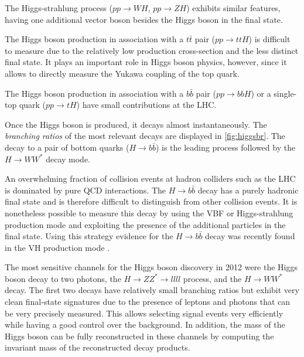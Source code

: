 
The Higgs-strahlung process ($pp \rightarrow WH$, $pp \rightarrow ZH$) exhibits similar features, having one additional vector boson besides the Higgs boson in the final state.

The Higgs boson production in association with a $t\bar{t}$ pair ($pp \rightarrow ttH$) is difficult to measure due to the relatively low production cross-section and the less distinct final state. It plays an important role in Higgs boson physics, however, since it allows to directly measure the Yukawa coupling of the top quark. 

The Higgs boson production in association with a $b\bar{b}$ pair ($pp\rightarrow bbH$) or a single-top quark ($pp \rightarrow tH$) have small contributions at the LHC.


Once the Higgs boson is produced, it decays almost instantaneously. The \emph{branching ratios} of the most relevant decays are displayed in \cref{fig:higgsbr}. The decay to a pair of bottom quarks ($H\rightarrow b\bar{b}$) is the leading process followed by the $H\rightarrow WW^*$ decay mode.

An overwhelming fraction of collision events at hadron colliders such as the LHC is dominated by pure QCD interactions.
The $H\rightarrow b\bar{b}$ decay has a purely hadronic final state and is therefore difficult to distinguish from other collision events.
It is nonetheless possible to measure this decay by using the VBF or Higgs-strahlung production mode and exploiting the presence of the additional particles in the final state. Using this strategy evidence for the $H\rightarrow b\bar{b}$ decay was recently found in the VH production mode \cite{Aaboud:2017xsd,Sirunyan:2017elk}.

The most sensitive channels for the Higgs boson discovery in 2012 were the Higgs boson decay to two photons, the $H \rightarrow ZZ^* \rightarrow llll$ process, and the $H \to WW^*$ decay.
The first two decays have relatively small branching ratios but exhibit very clean final-state signatures due to the presence of leptons and photons that can be very precisely measured.
This allows selecting signal events very efficiently while having a good control over the background.
In addition, the mass of the Higgs boson can be fully reconstructed in these channels by computing the invariant mass of the reconstructed decay products.

